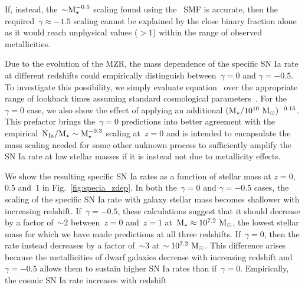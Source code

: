 \documentclass[foo.tex]{subfiles}
\begin{document}
If, instead, the~$\sim$$\mstar^{-0.5}$ scaling found using the~\citet{Bell2003}
SMF is accurate, then the required~$\gamma \approx -1.5$ scaling cannot be
explained by the close binary fraction alone as it would reach unphysical
values ($>1$) within the range of observed metallicities.
\par
Due to the evolution of the MZR, the mass dependence of the specific SN Ia rate
at different redshifts could empirically distinguish between~$\gamma = 0$ and
$\gamma = -0.5$.
To investigate this possibility, we simply evaluate equation~
over the appropriate range of lookback times assuming standard cosmological
parameters~\citep{Planck2014}.
For the~$\gamma = 0$ case, we also show the effect of applying an additional
$(\mstar / 10^{10}~\msun)^{-0.15}$.
This prefactor brings the~$\gamma = 0$ predictions into better agreement with
the empirical~$\dot{\text{N}}_\text{Ia} / \mstar \sim \mstar^{-0.3}$ scaling
at~$z = 0$ and is intended to encapsulate the mass scaling needed for some
other unknown process to sufficiently amplify the SN Ia rate at low stellar
masses if it is instead not due to metallicity effects.
\par
We show the resulting specific SN Ia rates as a function of stellar mass at
$z = 0$,~$0.5$ and~$1$ in Fig.~\ref{fig:specia_zdep}.
In both the~$\gamma = 0$ and $\gamma = -0.5$ cases, the scaling of the specific
SN Ia rate with galaxy stellar mass becomes shallower with increasing redshift.
If~$\gamma = -0.5$, these calculations suggest that it should decrease by a
factor of~$\sim$2 between~$z = 0$ and~$z = 1$ at~$\mstar \approx
10^{7.2}~\msun$, the lowest stellar mass for which we have made predictions at
all three redshifts.
If~$\gamma = 0$, then the rate instead decreases by a factor of~$\sim$3 at
$\sim 10^{7.2}~\msun$.
This difference arises because the metallicities of dwarf galaxies decrease
with increasing redshift and~$\gamma = -0.5$ allows them to sustain higher
SN Ia rates than if~$\gamma = 0$.
Empirically, the cosmic SN Ia rate increases with redshift
$$
\end{document}
